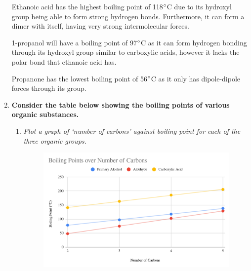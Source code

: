 \documentclass{report}
\begin{document}
\begin{enumerate}
			\begin{center}
			\end{center}
			\begin{center}
			\end{center}
			\begin{center}
			\end{center}

			Ethanoic acid has the highest boiling point of 118$\degree$C due to its hydroxyl group being able to form strong hydrogen bonds. Furthermore, it can form a dimer with itself, having very strong intermolecular forces.

			1-propanol will have a boiling point of 97$\degree$C as it can form hydrogen bonding through its hydroxyl group similar to carboxylic acids, however it lacks the polar  bond that ethanoic acid has.

			Propanone has the lowest boiling point of 56$\degree$C as it only has dipole-dipole forces through its  group.

		\newpage

		\item \textbf{Consider the table below showing the boiling points of various organic substances.}

			\begin{enumerate}
				\item \textit{Plot a graph of ‘number of carbons’ against boiling point for each of the three organic groups.}

					\begin{figure}[H]
						\centering
						\includegraphics[width=15cm]{chapter_9_review_graph.png}
					\end{figure}


\end{enumerate}
\end{enumerate}
\end{document}
